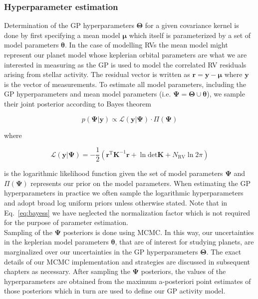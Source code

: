 \subsubsection{Hyperparameter estimation}
Determination of the GP hyperparameters $\boldsymbol{\Theta}$ for a given covariance kernel is
done by first specifying a mean model $\boldsymbol{\mu}$ which itself is parameterized by
a set of model parameters $\boldsymbol{\theta}$. In the case of modelling RVs the mean model
might represent our planet model whose keplerian orbital parameters are what we are interested
in measuring as the GP is used to model the correlated RV residuals arising from stellar
activity. The residual vector is written as $\mathbf{r} = \mathbf{y} - \boldsymbol{\mu}$
where $\mathbf{y}$ is the vector of \nrv{} measurements. 
To estimate all model parameters, including the GP hyperparameters and mean model
parameters (i.e. $\boldsymbol{\Psi} = \boldsymbol{\Theta} \cup \boldsymbol{\theta}$),
we sample their joint posterior according to Bayes theorem

\begin{equation}
  p(\boldsymbol{\Psi}|\mathbf{y}) \propto \mathcal{L}(\mathbf{y}|\boldsymbol{\Psi}) \cdot
  \Pi(\boldsymbol{\Psi})
  \label{eq:bayess}
\end{equation}

\noindent where

\begin{equation}
  \mathcal{L}(\mathbf{y}|\boldsymbol{\Psi}) =
  -\frac{1}{2} \left( \mathbf{r}^{\text{T}} \mathbf{K}^{-1} \mathbf{r} +
  \ln{\text{det}\mathbf{K}} + N_{\text{RV}} \ln{2\pi} \right)
  \label{eq:lnlikeGP}
\end{equation}

\noindent is the logarithmic likelihood function given the set of model parameters
$\boldsymbol{\Psi}$ and $\Pi(\boldsymbol{\Psi})$ represents our prior on
the model parameters. When estimating the GP hyperparameters in practice we
often sample the logarithmic hyperparameters and adopt broad log uniform priors
unless otherwise stated. Note that in Eq.~\ref{eq:bayess}
we have neglected the normalization factor which is not required
for the purpose of parameter estimation. \\

Sampling of the $\boldsymbol{\Psi}$ posteriors is done using MCMC. In this way, our
uncertainties in the keplerian model parameters $\boldsymbol{\theta}$,
that are of interest for studying planets, are marginalized over our uncertainties in
the GP hyperparameters $\boldsymbol{\Theta}$. The exact details of
our MCMC implementation and strategies are discussed in subsequent chapters
as necessary. After sampling the $\boldsymbol{\Psi}$ posteriors, the values of the
hyperparameters are obtained from the maximum a-posteriori point estimates of those
posteriors which in turn are used to define our GP activity model.

